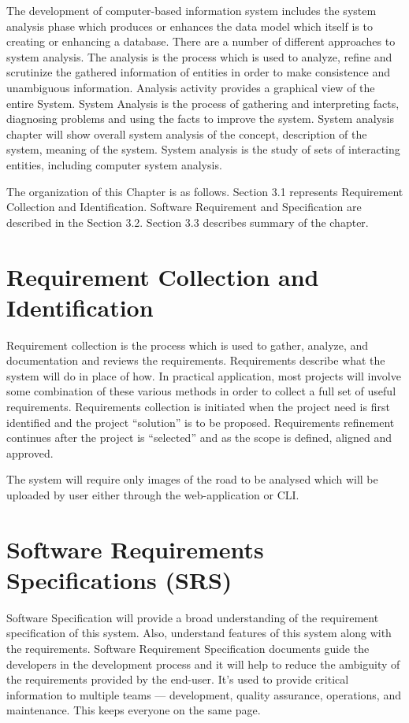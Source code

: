 
The development of computer-based information system includes the system analysis phase which produces or enhances the data model which itself is to creating or enhancing a database.   There are a number of different approaches to system analysis.    The analysis is the process which is used to analyze, refine and scrutinize the gathered information of entities in order to make consistence and unambiguous information. Analysis activity provides a graphical view of the entire System. System Analysis is the process of gathering and interpreting facts, diagnosing problems and using the facts to improve the system. System analysis chapter will show overall system analysis of the concept, description of the system, meaning of the system. System analysis is the study of sets of interacting entities, including computer system analysis.

The organization of this Chapter is as follows. Section 3.1 represents Requirement Collection and Identification. Software Requirement and Specification are described in the Section
3.2. Section 3.3 describes summary of the chapter.

\section{Requirement Collection and Identification}
Requirement collection is the process which is used to gather, analyze, and documentation and reviews the requirements. Requirements describe what the system will do in place of how. In practical application, most projects will involve some combination of these various methods in order to collect a full set of useful requirements. Requirements collection is initiated when the project need is first identified and the project “solution” is to be proposed. Requirements refinement continues after the project is “selected” and as the scope is defined, aligned and approved.

The system will require only images of the road to be analysed which will be uploaded by user either through the web-application or CLI.

\section{Software Requirements Specifications (SRS)}
Software Specification will provide a broad understanding of the requirement specification of this system. Also, understand features of this system along with the requirements. Software Requirement Specification documents guide the developers in the development process and it will help to reduce the ambiguity of the requirements provided by the end-user. It’s used to provide critical information to multiple teams — development, quality assurance, operations, and maintenance. This keeps everyone on the same page.
